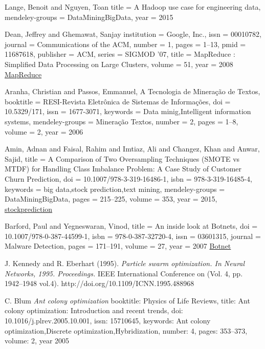 \documentclass[conference,compsoc]{IEEEtran}
\begin{document}
\begin{thebibliography}{1}
Lange, Benoit and Nguyen, Toan
title = {{A Hadoop use case for engineering data}},
mendeley-groups = {DataMiningBigData},
year = {2015}


Dean, Jeffrey and Ghemawat, Sanjay
institution = {Google, Inc.},
issn = {00010782},
journal = {Communications of the ACM},
number = {1},
pages = {1--13},
pmid = {11687618},
publisher = {ACM},
series = {SIGMOD '07},
title = {{MapReduce : Simplified Data Processing on Large Clusters}},
volume = {51},
year = {2008}
\href{http://portal.acm.org/citation.cfm?id=1327492}{MapReduce}


Aranha, Christian and Passos, Emmanuel,
A Tecnologia de Mineração de Textos,
booktitle = {RESI-Revista Eletrônica de Sistemas de Informações},
doi = {10.5329/171},
issn = {1677-3071},
keywords = {Data minig,Intelligent information systems},
mendeley-groups = {Mineração Textos},
number = {2},
pages = {1--8},
volume = {2},
year = {2006}


Amin, Adnan and Faisal, Rahim and Imtiaz, Ali and Changez, Khan and Anwar, Sajid,
title = {{A Comparison of Two Oversampling Techniques (SMOTE vs MTDF) for Handling Class Imbalance Problem: A Case Study of Customer Churn Prediction}},
doi = {10.1007/978-3-319-16486-1},
isbn = {978-3-319-16485-4},
keywords = {big data,stock prediction,text mining},
mendeley-groups = {DataMiningBigData},
pages = {215--225},
volume = {353},
year = {2015},
\href{http://link.springer.com/10.1007/978-3-319-16486-1}{stockprediction}



Barford, Paul and Yegneswaran, Vinod,
title = {{An inside look at Botnets}},
doi = {10.1007/978-0-387-44599-1},
isbn = {978-0-387-32720-4},
issn = {03601315},
journal = {Malware Detection},
pages = {171--191},
volume = {27},
year = {2007}
\href{http://www.springerlink.com/index/10.1007/978-0-387-44599-1}{Botnet}


J. Kennedy and R. Eberhart (1995). 
\emph{Particle swarm optimization. In Neural Networks, 1995. Proceedings.}
IEEE International Conference on (Vol. 4, pp. 1942–1948 vol.4). http://doi.org/10.1109/ICNN.1995.488968

C. Blum
\emph{Ant colony optimization}
booktitle: {Physics of Life Reviews},
title: {{Ant colony optimization: Introduction and recent trends}},
doi: {10.1016/j.plrev.2005.10.001},
issn: {15710645},
keywords: {Ant colony optimization,Discrete optimization,Hybridization},
number: {4},
pages: {353--373},
volume: {2},
year {2005}


\end{thebibliography}
\end{document}
